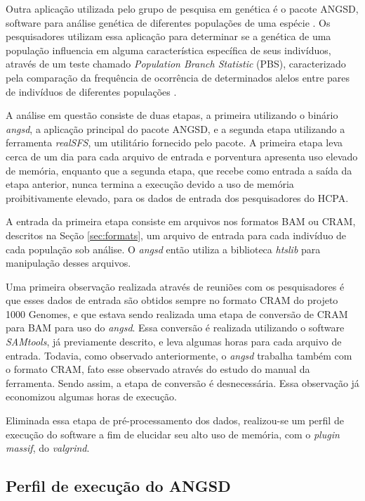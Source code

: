 \documentclass[cic,tc]{iiufrgs}
\begin{document}
Outra aplicação utilizada pelo grupo de pesquisa em genética é o pacote ANGSD,
software para análise genética de diferentes populações de uma
espécie \cite{korneliussen2014angsd}. Os pesquisadores utilizam essa aplicação
para determinar se a genética de uma população influencia em alguma
característica específica de seus indivíduos, através de um teste chamado
\textit{Population Branch Statistic} (PBS), caracterizado pela comparação da
frequência de ocorrência de determinados alelos entre pares de
indivíduos de diferentes populações \cite{yi2010sequencing}.

A análise em questão consiste de duas etapas, a primeira utilizando o binário
\textit{angsd}, a aplicação principal do pacote ANGSD, e a segunda etapa utilizando a
ferramenta \textit{realSFS}, um utilitário fornecido pelo pacote. A primeira etapa leva
cerca de um dia para cada arquivo de entrada e porventura apresenta uso elevado
de memória, enquanto que a segunda etapa, que recebe como entrada a saída da
etapa anterior, nunca termina a execução devido a uso de memória
proibitivamente elevado, para os dados de entrada dos pesquisadores do HCPA.

A entrada da primeira etapa consiste em arquivos nos formatos BAM ou CRAM,
descritos na Seção \ref{sec:formats}, um arquivo de entrada para cada indivíduo
de cada população sob análise. O \textit{angsd} então utiliza a biblioteca
\textit{htslib} para manipulação desses arquivos.

Uma primeira observação realizada através de reuniões com os pesquisadores é
que esses dados de entrada são obtidos sempre no formato CRAM do projeto 1000
Genomes, e que estava sendo realizada uma etapa de conversão de CRAM para BAM
para uso do \textit{angsd}. Essa conversão é realizada utilizando o software
\textit{SAMtools}, já previamente descrito, e leva algumas horas para cada arquivo de
entrada. Todavia, como observado anteriormente, o \textit{angsd} trabalha também com o
formato CRAM, fato esse observado através do estudo do manual da ferramenta.
Sendo assim, a etapa de conversão é desnecessária. Essa observação já
economizou algumas horas de execução.

Eliminada essa etapa de pré-processamento dos dados, realizou-se um perfil de
execução do software a fim de elucidar seu alto uso de memória, com o
\textit{plugin} \textit{massif}, do \textit{valgrind}.

\subsection{Perfil de execução do ANGSD}
\end{document}
